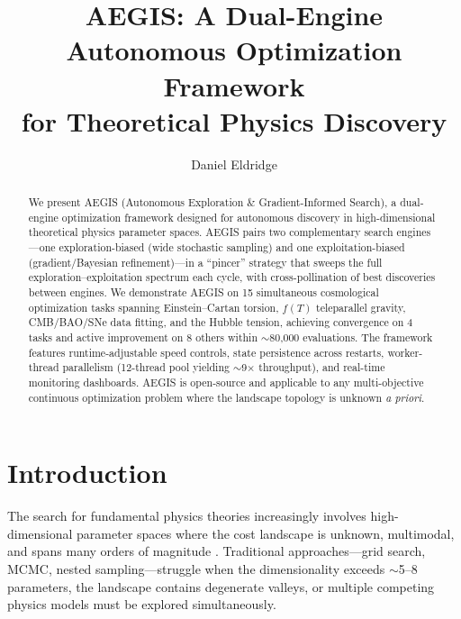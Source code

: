 \documentclass[12pt,preprint]{aastex631}
\begin{document}
\title{AEGIS: A Dual-Engine Autonomous Optimization Framework\\
for Theoretical Physics Discovery}

\author{Daniel Eldridge}

\begin{abstract}
We present AEGIS (Autonomous Exploration \& Gradient-Informed Search),
a dual-engine optimization framework designed for autonomous discovery
in high-dimensional theoretical physics parameter spaces.
AEGIS pairs two complementary search engines---one exploration-biased (wide stochastic sampling)
and one exploitation-biased (gradient/Bayesian refinement)---in a ``pincer'' strategy
that sweeps the full exploration--exploitation spectrum each cycle, with cross-pollination
of best discoveries between engines. We demonstrate AEGIS on 15 simultaneous cosmological
optimization tasks spanning Einstein--Cartan torsion, $f(T)$ teleparallel gravity,
CMB/BAO/SNe data fitting, and the Hubble tension, achieving convergence on 4 tasks
and active improvement on 8 others within $\sim$80{,}000 evaluations. The framework
features runtime-adjustable speed controls, state persistence across restarts,
worker-thread parallelism (12-thread pool yielding $\sim$9$\times$ throughput),
and real-time monitoring dashboards. AEGIS is open-source and applicable to any
multi-objective continuous optimization problem where the landscape topology is unknown
\textit{a priori}.
\end{abstract}


\section{Introduction}
\label{sec:intro}

The search for fundamental physics theories increasingly involves
high-dimensional parameter spaces where the cost landscape is unknown,
multimodal, and spans many orders of magnitude
\citep{Akrami2020,DESI2024,Riess2022}.
Traditional approaches---grid search, MCMC, nested sampling---struggle
when the dimensionality exceeds $\sim$5--8 parameters, the landscape
contains degenerate valleys, or multiple competing physics models
must be explored simultaneously.
\end{document}
